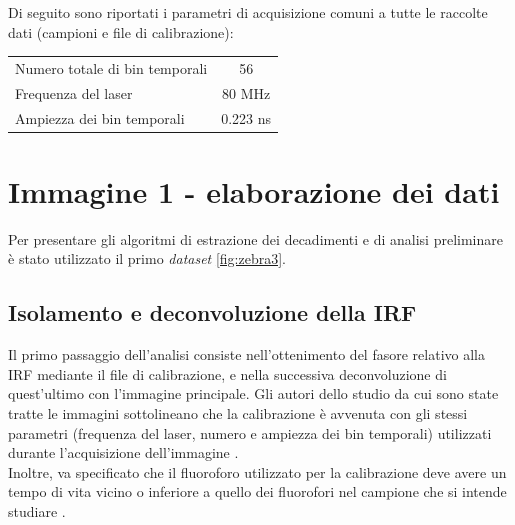 \noindent Di seguito sono riportati i parametri di acquisizione comuni a tutte le raccolte dati (campioni e file di calibrazione):
\begin{center}
    \centering
    \begin{tabular}{lc}
        \toprule
        Numero totale di bin temporali & 56 \\
        Frequenza del laser & 80 MHz \\
        Ampiezza dei bin temporali & 0.223 ns \\
        \bottomrule
    \end{tabular}
    \vspace{0.2cm}
\end{center}

\vspace{5pt}

\section{Immagine 1 - elaborazione dei dati}

Per presentare gli algoritmi di estrazione dei decadimenti e di analisi preliminare è stato utilizzato il primo \textit{dataset} \ref{fig:zebra3}.

\subsection{Isolamento e deconvoluzione della IRF}

Il primo passaggio dell'analisi consiste nell'ottenimento del fasore relativo alla IRF mediante il file di calibrazione, e nella successiva deconvoluzione di quest'ultimo con l'immagine principale.
Gli autori dello studio da cui sono state tratte le immagini sottolineano che la calibrazione è avvenuta con gli stessi parametri (frequenza del laser, numero e ampiezza dei bin temporali) utilizzati durante l'acquisizione dell'immagine \cite{gottliebFLUTEPythonGUI2023a}.\\
Inoltre, va specificato che il fluoroforo utilizzato per la calibrazione deve avere un tempo di vita vicino o inferiore a quello dei fluorofori nel campione che si intende studiare \cite{gottliebFLUTEPythonGUI2023a}.


